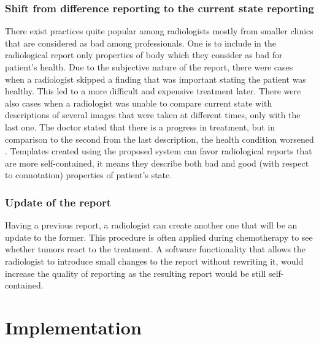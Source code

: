 \documentclass[12pt, twoside, openany]{report}
\theoremstyle{definition}
\begin{document}
\subsection{Shift from difference reporting to the current state reporting}
There exist practices quite popular among radiologists mostly from smaller clinics that are considered as bad among professionals. One is to include in the radiological report only properties of body which they consider as bad for patient's health. Due to the subjective nature of the report, there were cases when a radiologist skipped a finding that was important stating the patient was healthy. This led to a more difficult and expensive treatment later.
There were also cases when a radiologist was unable to compare current state with descriptions of several images that were taken at different times, only with the last one. The doctor stated that there is a progress in treatment, but in comparison to the second from the last description, the health condition worsened \cite{risk-management}.
Templates created using the proposed system can favor radiological reports that are more self-contained, it means they describe both bad and good (with respect to connotation) properties of patient's state.

\subsection{Update of the report}
Having a previous report, a radiologist can create another one that will be an update to the former. This procedure is often applied during chemotherapy to see whether tumors react to the treatment. A software functionality that allows the radiologist to introduce small changes to the report without rewriting it, would increase the quality of reporting as the resulting report would be still self-contained. 




\chapter{Implementation}
\end{document}
